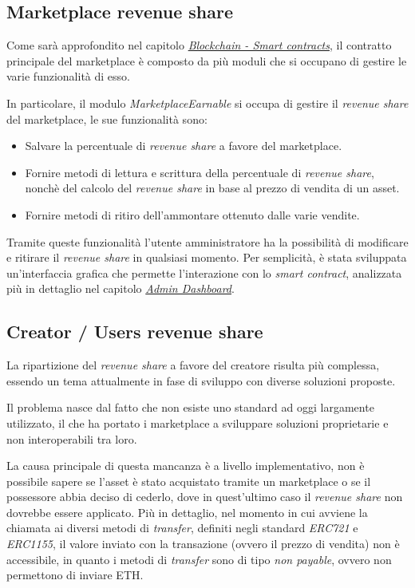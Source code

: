 \subsection{Marketplace revenue share}
Come sarà approfondito nel capitolo \hyperref[sec:smart-contract-shopychange]{\textit{Blockchain - Smart contracts}}, il contratto principale del marketplace è composto da più moduli che si occupano di gestire le varie funzionalità di esso.

In particolare, il modulo \textit{MarketplaceEarnable} si occupa di gestire il \textit{revenue share} del marketplace, le sue funzionalità sono:

\begin{itemize}
    \item Salvare la percentuale di \textit{revenue share} a favore del marketplace.
    \item Fornire metodi di lettura e scrittura della percentuale di \textit{revenue share}, nonchè del calcolo del \textit{revenue share} in base al prezzo di vendita di un asset.
    \item Fornire metodi di ritiro dell'ammontare ottenuto dalle varie vendite.
\end{itemize}

Tramite queste funzionalità l'utente amministratore ha la possibilità di modificare e ritirare il \textit{revenue share} in qualsiasi momento. Per semplicità, è stata sviluppata un'interfaccia grafica che permette l'interazione con lo \textit{smart contract}, analizzata più in dettaglio nel capitolo \hyperref[sec:admin-dashboard]{\textit{Admin Dashboard}}.

\subsection{Creator / Users revenue share}
La ripartizione del \textit{revenue share} a favore del creatore risulta più complessa, essendo un tema attualmente in fase di sviluppo con diverse soluzioni proposte.

Il problema nasce dal fatto che non esiste uno standard ad oggi largamente utilizzato, il che ha portato i marketplace a sviluppare soluzioni proprietarie e non interoperabili tra loro. 

La causa principale di questa mancanza è a livello implementativo, non è possibile sapere se l'asset è stato acquistato tramite un marketplace o se il possessore abbia deciso di cederlo, dove in quest'ultimo caso il \textit{revenue share} non dovrebbe essere applicato.
Più in dettaglio, nel momento in cui avviene la chiamata ai diversi metodi di \textit{transfer}, definiti negli standard \textit{ERC721} e \textit{ERC1155}, il valore inviato con la transazione (ovvero il prezzo di vendita) non è accessibile, in quanto i metodi di \textit{transfer} sono di tipo \textit{non payable}, ovvero non permettono di inviare ETH. 

